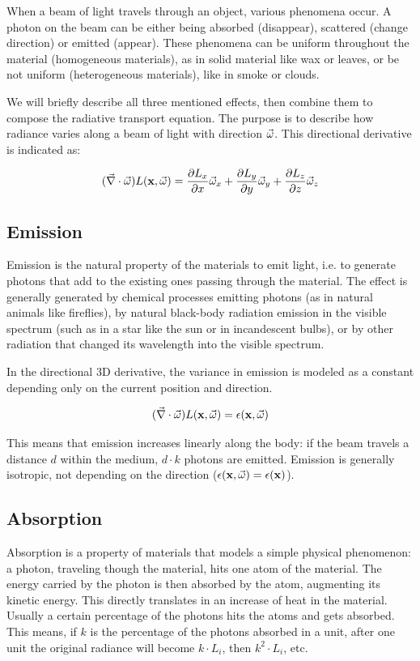 When a beam of light travels through an object, various phenomena occur. A photon on the beam can be either being absorbed (disappear), scattered (change direction) or emitted (appear). These phenomena can be uniform throughout the material (homogeneous materials), as in solid material like wax or leaves, or be not uniform (heterogeneous materials), like in smoke or clouds.

We will briefly describe all three mentioned effects, then combine them to compose the radiative transport equation. The purpose is to describe how radiance varies along a beam of light with direction $\vec{\omega}$. This directional derivative is indicated as:

$$
(\vec{\nabla} \cdot \vec{\omega}) L(\mathbf{x}, \vec{\omega}) = \frac{\partial L_x}{\partial x} \vec{\omega}_x + \frac{\partial L_y}{\partial y} \vec{\omega}_y +\frac{\partial L_z}{\partial z} \vec{\omega}_z
$$ 

\subsection{Emission}
Emission is the natural property of the materials to emit light, i.e. to generate photons that add to the existing ones passing through the material. The effect is generally generated by chemical processes emitting photons (as in natural animals like fireflies), by natural black-body radiation emission in the visible spectrum (such as in a star like the sun or in incandescent bulbs), or by other radiation that changed its wavelength into the visible spectrum.

In the directional 3D derivative, the variance in emission is modeled as a constant depending only on the current position and direction.

$$
(\vec{\nabla} \cdot \vec{\omega}) L(\mathbf{x}, \vec{\omega}) = \epsilon(\mathbf{x}, \vec{\omega})
$$

This means that emission increases linearly along the body: if the beam travels a distance $d$ within the medium, $d \cdot k$ photons are emitted. Emission is generally isotropic, not depending on the direction ($ \epsilon(\mathbf{x}, \vec{\omega}) =  \epsilon(\mathbf{x})$).

\subsection{Absorption}
Absorption is a property of materials that models a simple physical phenomenon: a photon, traveling though the material, hits one atom of the material. The energy carried by the photon is then absorbed by the atom, augmenting its kinetic energy. This directly translates in an increase of heat in the material. Usually a certain percentage of the photons hits the atoms and gets absorbed. This means, if $k$ is the percentage of the photons absorbed in a unit, after one unit the original radiance will become $k \cdot L_i$, then $k^2 \cdot L_i$, etc.

